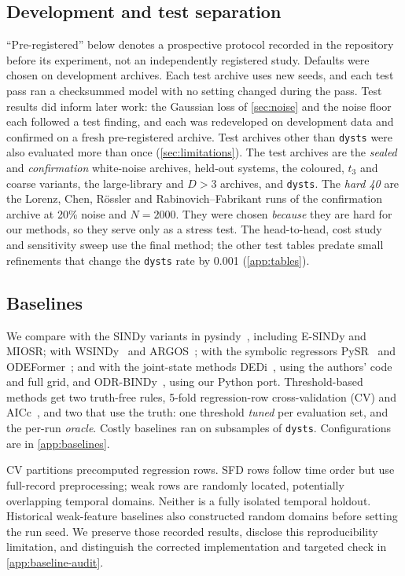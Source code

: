 \subsection{Development and test separation}
\label{sec:freezing}
``Pre-registered'' below denotes a prospective protocol recorded in the repository before its experiment, not an independently registered study.
Defaults were chosen on development archives. Each test archive uses new seeds, and each test pass ran a checksummed model with no setting changed during the pass. Test results did inform later work: the Gaussian loss of \cref{sec:noise} and the noise floor each followed a test finding, and each was redeveloped on development data and confirmed on a fresh pre-registered archive. Test archives other than \texttt{dysts} were also evaluated more than once (\cref{sec:limitations}). The test archives are the \emph{sealed} and \emph{confirmation} white-noise archives, held-out systems, the coloured, $t_3$ and coarse variants, the large-library and $D>3$ archives, and \texttt{dysts}. The \emph{hard 40} are the Lorenz, Chen, R\"ossler and Rabinovich--Fabrikant runs of the confirmation archive at 20\% noise and $N=2000$. They were chosen \emph{because} they are hard for our methods, so they serve only as a stress test. The head-to-head, cost study and sensitivity sweep use the final method; the other test tables predate small refinements that change the \texttt{dysts} rate by 0.001 (\cref{app:tables}).

\subsection{Baselines}
\label{sec:baseline-config}
We compare with the SINDy variants in pysindy~\citep{desilva2020pysindy,kaptanoglu2022pysindy}, including E-SINDy and MIOSR; with WSINDy~\citep{messenger2021wsindy} and ARGOS~\citep{egan2024argos}; with the symbolic regressors PySR~\citep{cranmer2023pysr} and ODEFormer~\citep{dascoli2024odeformer}; and with the joint-state methods DEDi~\citep{meissner2024dedi}, using the authors' code and full grid, and ODR-BINDy~\citep{fung2025odrbindy}, using our Python port. Threshold-based methods get two truth-free rules, 5-fold regression-row cross-validation (CV) and AICc~\citep{mangan2017model}, and two that use the truth: one threshold \emph{tuned} per evaluation set, and the per-run \emph{oracle}. Costly baselines ran on subsamples of \texttt{dysts}. Configurations are in \cref{app:baselines}.


CV partitions precomputed regression rows. SFD rows follow time order but use full-record preprocessing; weak rows are randomly located, potentially overlapping temporal domains. Neither is a fully isolated temporal holdout. Historical weak-feature baselines also constructed random domains before setting the run seed. We preserve those recorded results, disclose this reproducibility limitation, and distinguish the corrected implementation and targeted check in \cref{app:baseline-audit}.

